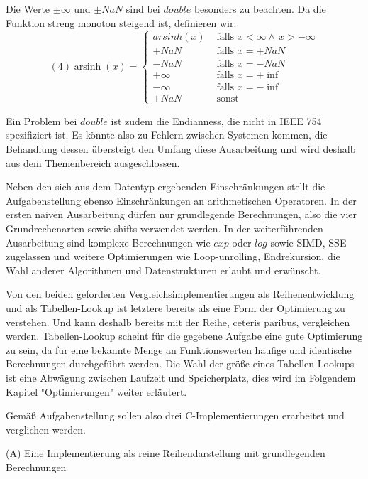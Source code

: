 \documentclass[course=erap]{aspdoc}
\begin{document}
    Die Werte $\pm \infty$ und $\pm NaN$ sind bei $double$ besonders zu beachten.
    Da die Funktion streng monoton steigend ist, definieren wir:
    \[(4) \operatorname{arsinh}(x) =
    \begin{cases}
        arsinh(x)     & \text{ falls } x < \infty \wedge \, x > -\infty \\
        +NaN  & \text{ falls } x = +NaN \\
        -NaN  & \text{ falls } x = -NaN \\
        +\infty     & \text{ falls } x = +\inf \\
        -\infty     & \text{ falls } x = -\inf \\
        +NaN     & \text{ sonst }

    \end{cases}\]


    Ein Problem bei $double$ ist zudem die Endianness, die nicht in IEEE 754~\cite{StandardforBinaryFloating-PointArithmetic} spezifiziert ist.
    Es könnte also zu Fehlern zwischen Systemen kommen, die Behandlung dessen übersteigt den Umfang diese Ausarbeitung und wird deshalb aus dem Themenbereich ausgeschlossen.


    Neben den sich aus dem Datentyp ergebenden Einschränkungen stellt die Aufgabenstellung ebenso Einschränkungen an arithmetischen Operatoren.
    In der ersten naiven Ausarbeitung dürfen nur grundlegende Berechnungen, also die vier Grundrechenarten sowie shifts verwendet werden.
    In der weiterführenden Ausarbeitung sind komplexe Berechnungen wie $exp$ oder $log$ sowie SIMD, SSE zugelassen und weitere Optimierungen wie Loop-unrolling, Endrekursion, die Wahl anderer Algorithmen und Datenstrukturen erlaubt und erwünscht.


    Von den beiden geforderten Vergleichsimplementierungen als Reihenentwicklung und als Tabellen-Lookup ist letztere bereits als eine Form der Optimierung zu verstehen.
    Und kann deshalb bereits mit der Reihe, ceteris paribus, vergleichen werden.
    Tabellen-Lookup scheint für die gegebene Aufgabe eine gute Optimierung zu sein, da für eine bekannte Menge an Funktionswerten häufige und identische Berechnungen durchgeführt werden.
    Die Wahl der größe eines Tabellen-Lookups ist eine Abwägung zwischen Laufzeit und Speicherplatz, dies wird im Folgendem Kapitel "Optimierungen" weiter erläutert.


    Gemäß Aufgabenstellung sollen also drei C-Implementierungen erarbeitet und verglichen werden.


    (A) Eine Implementierung als reine Reihendarstellung mit grundlegenden Berechnungen
\end{document}
